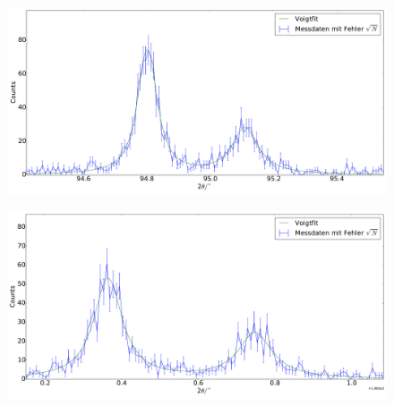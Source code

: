 \begin{figure}[H]
\begin{minipage}{.5\textwidth}
  \centering
  \includegraphics[scale=0.15]{messung_pulver_7}
  \label{fig:pul_mess_7}
\end{minipage}
\hspace{0.5cm}
\begin{minipage}{.5\textwidth}
  \centering
  \includegraphics[scale=0.15]{messung_pulver_8}
  \label{fig:pul_mess_8}
\end{minipage}
\end{figure}
